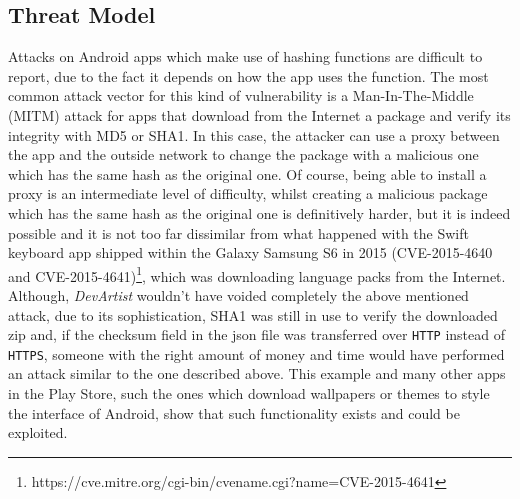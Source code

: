 \subsection{Threat Model}
Attacks on Android apps which make use of hashing functions are difficult to report, due to the fact it depends on how the app uses the function. The most common attack vector for this kind of vulnerability is a Man-In-The-Middle (MITM) attack for apps that download from the Internet a package and verify its integrity with MD5 or SHA1. In this case, the attacker can use a proxy between the app and the outside network to change the package with a malicious one which has the same hash as the original one. Of course, being able to install a proxy is an intermediate level of difficulty, whilst creating a malicious package which has the same hash as the original one is definitively harder, but it is indeed possible and it is not too far dissimilar from what happened with the Swift keyboard app shipped within the Galaxy Samsung S6 in 2015 (CVE-2015-4640 and CVE-2015-4641)\footnote{https://cve.mitre.org/cgi-bin/cvename.cgi?name=CVE-2015-4641}, which was downloading language packs from the Internet. Although, \emph{DevArtist} wouldn't have voided completely the above mentioned attack, due to its sophistication, SHA1 was still in use to verify the downloaded zip and, if the checksum field in the json file was transferred over \texttt{HTTP} instead of \texttt{HTTPS}, someone with the right amount of money and time would have performed an attack similar to the one described above. This example and many other apps in the Play Store, such the ones which download wallpapers or themes to style the interface of Android, show that such functionality exists and could be exploited. 


